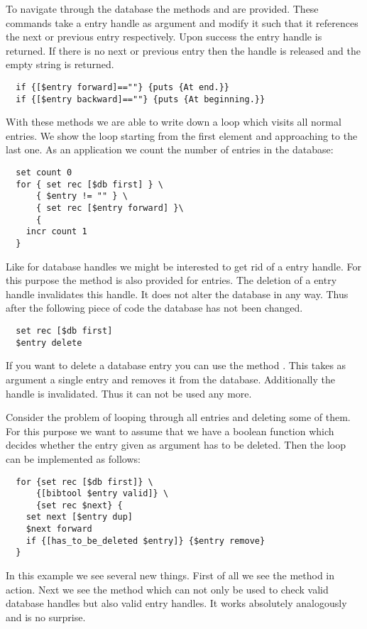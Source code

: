 To navigate through the database the methods  and
 are provided. These commands take a entry handle as
argument and modify it such that it references the next or previous
entry respectively. Upon success the entry handle is returned. If
there is no next or previous entry then the handle is released and
the empty string is returned.
\begin{verbatim}
  if {[$entry forward]==""} {puts {At end.}}
  if {[$entry backward]==""} {puts {At beginning.}}
\end{verbatim}

With these methods we are able to write down a loop which visits all
normal entries. We show the loop starting from the first element and
approaching to the last one. As an application we count the number of
entries in the database:
\begin{verbatim}
  set count 0
  for { set rec [$db first] } \
      { $entry != "" } \
      { set rec [$entry forward] }\
      {
    incr count 1
  }
\end{verbatim}%



Like for database handles we might be interested to get rid of a
entry handle.  For this purpose the method  is also
provided for entries.  The deletion of a entry handle invalidates
this handle. It does not alter the database in any way. Thus after the
following piece of code the database has not been changed. 
\begin{verbatim}
  set rec [$db first]
  $entry delete
\end{verbatim}

\label{bibtool:remove}%
If you want to delete a database entry you can use the method
. This takes as argument a single entry and
removes it from the database. Additionally the handle is invalidated.
Thus it can not be used any more.

Consider the problem of looping through all entries and deleting some
of them. For this purpose we want to assume that we have a boolean
function  which decides whether the entry
given as argument has to be deleted. Then the loop can be implemented
as follows:
\begin{verbatim}
  for {set rec [$db first]} \
      {[bibtool $entry valid]} \
      {set rec $next} {
    set next [$entry dup]
    $next forward
    if {[has_to_be_deleted $entry]} {$entry remove}
  }
\end{verbatim}%
In this example we see several new things. First of all we see the
method  in action. Next we see the method
\code{bibtool valid} which can not only be used to check valid database
handles but also valid entry handles. It works absolutely analogously
and is no surprise. 

